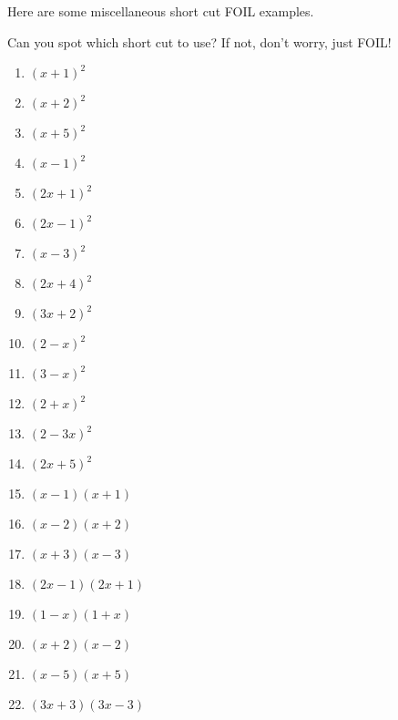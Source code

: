 \begin{myexample}
Here are some miscellaneous short cut FOIL examples.
\drillandskill
\end{myexample}
\begin{myProof}
	Can you spot  which short cut to use? If not, don't worry, just FOIL!
				
	\begin{multicols}{2}
		\begin{enumerate}
			\item $(x+1)^2$
			\item $(x+2)^2$
			\item $(x+5)^2$
			\item $(x-1)^2$
			\item $(2x+1)^2$
			\item $(2x-1)^2$
			\item $(x-3)^2$
			\item $(2x+4)^2$
			\item $(3x+2)^2$
			\item $(2-x)^2$
			\item $(3-x)^2$
			\item $(2+x)^2$
			\item $(2-3x)^2$
			\item $(2x+5)^2$
			\item $(x-1)(x+1)$
			\item $(x-2)(x+2)$
			\item $(x+3)(x-3)$
			\item $(2x-1)(2x+1)$
			\item $(1-x)(1+x)$
			\item $(x+2)(x-2)$
			\item $(x-5)(x+5)$
			\item $(3x+3)(3x-3)$
		\end{enumerate}
	\end{multicols}
\end{myProof} 

